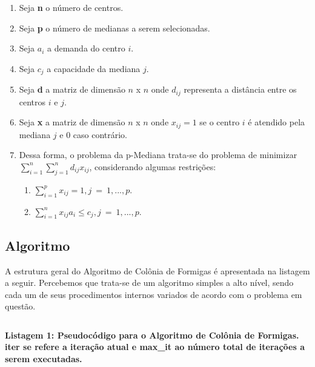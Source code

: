 \documentclass[12pt]{article}
\begin{document}
\begin{enumerate}
 \item Seja \textbf{n} o número de centros.
 \item Seja \textbf{p} o número de medianas a serem selecionadas.
 \item Seja $ a_i $ a demanda do centro $ i $.
 \item Seja $ c_j $ a capacidade da mediana $ j $.
 
 \item Seja \textbf{d} a matriz de dimensão $ n $ x $ n $ onde $ d_{ij} $ representa a distância entre
 os centros $ i $ e $ j $.
 
 \item Seja \textbf{x} a matriz de dimensão $ n $ x $ n $ onde $ x_{ij} = 1 $ se o centro $ i $ é atendido
 pela mediana $ j $ e $ 0 $ caso contrário.
 
 \item Dessa forma, o problema da p-Mediana trata-se do problema de minimizar
 $ \sum_{i=1}^{n} \sum_{j=1}^{n} d_{ij}x_{ij} $, considerando algumas restrições:
 
 \begin{enumerate}
  \item $ \sum_{i=1}^{p} x_{ij} = 1, j~=~1,...,p. $
  \item $ \sum_{i=1}^{n} x_{ij}a_i \leq c_j,j~=~1,...,p. $
 \end{enumerate}

\end{enumerate}

\subsection{Algoritmo}

A estrutura geral do Algoritmo de Colônia de Formigas é apresentada na listagem a seguir. Percebemos
que trata-se de um algoritmo simples a alto nível, sendo cada um de seus procedimentos internos variados
de acordo com o problema em questão.\\

\begin{mdframed}[linecolor=black, leftline=false, rightline=false]
    \inputminted[linenos, fontsize=\footnotesize]{text}{pseudo.txt}
\end{mdframed}

\begin{center}
 \textbf{Listagem 1: Pseudocódigo para o Algoritmo de Colônia de Formigas. iter se refere a iteração atual e
 max\_it ao número total de iterações a serem executadas.}
\end{center}
\end{document}
